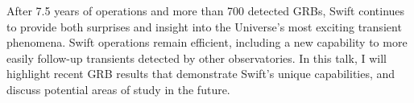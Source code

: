 


\bigskip



\bigskip

\noindent After 7.5 years of operations and more than 700 detected GRBs, Swift continues to provide both surprises and insight into the Universe’s most exciting transient phenomena.  Swift operations remain efficient, including a new capability to more easily follow-up transients detected by other observatories.  In this talk, I will highlight recent GRB results that demonstrate Swift’s unique capabilities, and discuss potential areas of study in the future.


